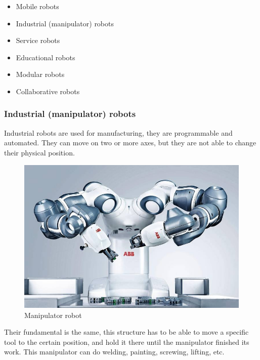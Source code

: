 			\begin{itemize}
				\item Mobile robots 
				\item Industrial (manipulator) robots 
				\item Service robots 
				\item Educational robots 
				\item Modular robots 
				\item Collaborative robots 
			\end{itemize}
			
			\subsubsection{Industrial (manipulator) robots}
			
				\hspace{15pt}Industrial robots are used for manufacturing, they are programmable and automated. They can move on two or more axes, but they are not able to change their physical position.
						
		\begin{figure}[H]
			\centering
			\includegraphics[width=\textwidth]{./images/manipulator}
			\caption{Manipulator robot\cite{manipulator}}
		\end{figure}
				
				Their fundamental is the same, this structure has to be able to move a specific tool to the certain position, and hold it there until the manipulator finished its work. This manipulator can do welding, painting, screwing, lifting, etc. \cite{robotics2}


